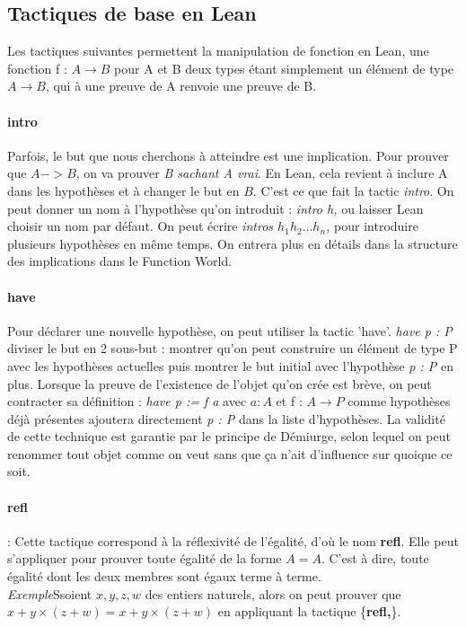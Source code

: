 \subsection{Tactiques de base en Lean}


Les tactiques suivantes permettent la manipulation de fonction en Lean, une fonction f : $A\to B$ pour A et B deux types étant simplement un élément de type $A\to B$, qui à une preuve de A renvoie une preuve de B.\\

\paragraph{intro}

Parfois, le but que nous cherchons à atteindre est une implication. Pour prouver que $A -> B$, on va prouver \textit{B sachant A vrai}. En Lean, cela revient à inclure A dans les hypothèses et à changer le but en $B$. C'est ce que fait la tactic \textit{intro}. On peut donner un nom à l'hypothèse qu'on introduit : \textit{intro h,} ou laisser Lean choisir un nom par défaut.
On peut écrire \textit{intros $h_1 h_2 \ldots h_n$,} pour introduire plusieurs hypothèses en même temps.
On entrera plus en détails dans la structure des implications dans le Function World.

\paragraph{have}

Pour déclarer une nouvelle hypothèse, on peut utiliser la tactic 'have'.
\textit{have p : P} diviser le but en 2 sous-but : montrer qu'on peut construire un élément de type P avec les hypothèses actuelles puis montrer le but initial avec l'hypothèse \textit{p : P} en plus.
Lorsque la preuve de l'existence de l'objet qu'on crée est brève, on peut contracter sa définition :
\textit{have p := f a} avec $a:A$ et f : $A \to P$ comme hypothèses déjà présentes ajoutera directement \textit{p : P} dans la liste d'hypothèses.
La validité de cette technique est garantie par le principe de Démiurge, selon lequel on peut renommer tout objet comme on veut sans que ça n'ait d'influence sur quoique ce soit.


\paragraph {\large \textbf{refl}}: Cette tactique correspond à la réflexivité de l'égalité, d'où le nom \textbf{refl}. Elle peut s'appliquer pour prouver toute égalité de la forme $A=A$. C'est à dire, toute égalité dont les deux membres sont égaux terme à terme. \\
\textit{Exemple}Ssoient $x,y,z,w$ des entiers naturels, alors on peut prouver que $x+y \times (z+w)=x+y \times (z+w)$ en appliquant la tactique \big\{\textbf{refl,}\big\}.
